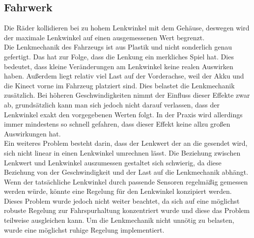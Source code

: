 \subsection{Fahrwerk}
\label{sec:fahrwerk}
Die Räder kollidieren bei zu hohem Lenkwinkel mit dem Gehäuse, deswegen wird der maximale Lenkwinkel auf einen ausgemessenen Wert begrenzt.
\\
Die Lenkmechanik des Fahrzeugs ist aus Plastik und nicht sonderlich genau gefertigt.
Das hat zur Folge, dass die Lenkung ein merkliches Spiel hat. 
Dies bedeutet, dass kleine Veränderungen am Lenkwinkel keine realen Auswirken haben. 
Außerdem liegt relativ viel Last auf der Vorderachse, weil der Akku und die Kinect vorne im Fahrzeug platziert sind. Dies belastet die Lenkmechanik zusätzlich.
Bei höheren Geschwindigkeiten nimmt der Einfluss dieser Effekte zwar ab, grundsätzlich kann man sich jedoch nicht darauf verlassen, dass der Lenkwinkel exakt den vorgegebenen Werten folgt.
In der Praxis wird allerdings immer mindestens so schnell gefahren, dass dieser Effekt keine allzu großen Auswirkungen hat.
\\
Ein weiteres Problem besteht darin, dass der Lenkwert der an die  gesendet wird, sich nicht linear in einen Lenkwinkel umrechnen lässt.
Die Beziehung zwischen Lenkwert und Lenkwinkel auszumessen gestaltet sich schwierig, da diese Beziehung von der Geschwindigkeit und der Last auf die Lenkmechanik abhängt.
Wenn der tatsächliche Lenkwinkel durch passende Sensoren regelmäßig gemessen werden würde, könnte eine Regelung für den Lenkwinkel konzipiert werden.
Dieses Problem wurde jedoch nicht weiter beachtet, da sich auf eine möglichst robuste Regelung zur Fahrspurhaltung konzentriert wurde und diese das Problem teilweise ausgleichen kann. 
Um die Lenkmechanik nicht unnötig zu belasten, wurde eine möglichst ruhige Regelung implementiert.





